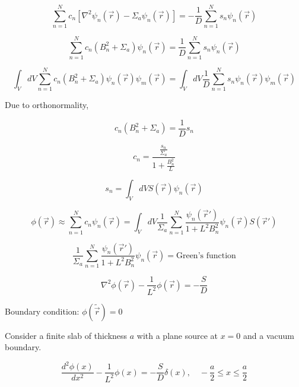 \documentclass[12pt]{article}
\newcommand{\rvec}{\ensuremath{\vec{r}}}
\begin{document}
\begin{equation*}
\sum_{n=1}^N c_n[\nabla^2\psi_n(\rvec) - \Sigma_a\psi_n(\rvec)]=-\frac{1}{D}\sum_{n=1}^N s_n\psi_n(\rvec)
\end{equation*}

\begin{equation*}
\sum_{n=1}^N c_n(B_n^2 + \Sigma_a)\psi_n(\rvec) = \frac{1}{D}\sum_{n=1}^N s_n\psi_n(\rvec)
\end{equation*}

\begin{equation*}
\int_V dV \sum_{n=1}^N c_n(B_n^2 + \Sigma_a)\psi_n(\rvec)\psi_m(\rvec) = 
\int_V dV \frac{1}{D}\sum_{n=1}^N s_n\psi_n(\rvec)\psi_m(\rvec)
\end{equation*}

Due to orthonormality,

\begin{equation*}
c_n(B_n^2 + \Sigma_a) = \frac{1}{D}s_n
\end{equation*}

\begin{equation*}
c_n = \frac{\frac{s_n}{\Sigma_a}}{1+\frac{B_n^2}{L}}
\end{equation*}

\begin{equation*}
s_n = \int_V dV S(\rvec)\psi_n(\rvec)
\end{equation*}

\begin{equation*}
\phi(\rvec) \approx \sum_{n=1}^N c_n\psi_n(\rvec) = 
\int_V dV \frac{1}{\Sigma_a} \sum_{n=1}^N \frac{\psi_n(\rvec')}{1+L^2B_n^2}\psi_n(\rvec)S(\rvec')
\end{equation*}

\begin{equation*}
\frac{1}{\Sigma_a} \sum_{n=1}^N \frac{\psi_n(\rvec')}{1+L^2B_n^2}\psi_n(\rvec) = \text{Green's function}
\end{equation*}


\begin{equation*}
\nabla^2\phi(\rvec) - \frac{1}{L^2}\phi(\rvec) = -\frac{S}{D}
\end{equation*}

Boundary condition: $\phi(\tilde{\rvec}) = 0$


Consider a finite slab of thickness $a$ with a plane source at $x=0$ and a vacuum boundary.

\begin{equation*}
\frac{d^2\phi(x)}{dx^2} - \frac{1}{L^2}\phi(x) = -\frac{S}{D}\delta(x),\quad
-\frac{a}{2} \leq x \leq \frac{a}{2}
\end{equation*}
\end{document}
